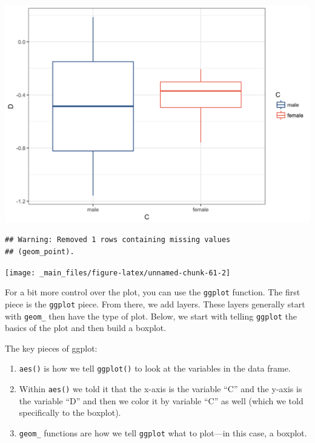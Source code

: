 \documentclass[]{tufte-book}
\newenvironment{Shaded}{}{}
\newcommand{\KeywordTok}[1]{\textcolor[rgb]{0.00,0.44,0.13}{\textbf{#1}}}
\newcommand{\OperatorTok}[1]{\textcolor[rgb]{0.40,0.40,0.40}{#1}}
\newcommand{\NormalTok}[1]{#1}
\providecommand{\tightlist}{%
  \setlength{\itemsep}{0pt}\setlength{\parskip}{0pt}}
\theoremstyle{definition}
\theoremstyle{definition}
\theoremstyle{remark}
\begin{document}
\includegraphics{_main_files/figure-latex/unnamed-chunk-61-1}

\begin{Shaded}
\end{Shaded}

\begin{verbatim}
## Warning: Removed 1 rows containing missing values
## (geom_point).
\end{verbatim}

\texttt{[image: \_main\_files/figure-latex/unnamed-chunk-61-2]}

For a bit more control over the plot, you can use the \texttt{ggplot}
function. The first piece is the \texttt{ggplot} piece. From there, we
add layers. These layers generally start with \texttt{geom\_} then have
the type of plot. Below, we start with telling \texttt{ggplot} the
basics of the plot and then build a boxplot.

The key pieces of ggplot:

\begin{enumerate}
\def\labelenumi{\arabic{enumi}.}
\tightlist
\item
  \texttt{aes()} is how we tell \texttt{ggplot()} to look at the
  variables in the data frame.
\item
  Within \texttt{aes()} we told it that the x-axis is the variable ``C''
  and the y-axis is the variable ``D'' and then we color it by variable
  ``C'' as well (which we told specifically to the boxplot).
\item
  \texttt{geom\_} functions are how we tell \texttt{ggplot} what to
  plot---in this case, a boxplot.
\end{enumerate}
\end{document}
